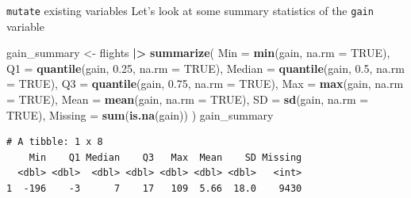 \documentclass[
  ignorenonframetext,
]{beamer}
\newenvironment{Shaded}{\begin{snugshade}}{\end{snugshade}}
\newcommand{\AttributeTok}[1]{\textcolor[rgb]{0.13,0.29,0.53}{#1}}
\newcommand{\ConstantTok}[1]{\textcolor[rgb]{0.56,0.35,0.01}{#1}}
\newcommand{\FloatTok}[1]{\textcolor[rgb]{0.00,0.00,0.81}{#1}}
\newcommand{\FunctionTok}[1]{\textcolor[rgb]{0.13,0.29,0.53}{\textbf{#1}}}
\newcommand{\NormalTok}[1]{#1}
\newcommand{\OtherTok}[1]{\textcolor[rgb]{0.56,0.35,0.01}{#1}}
\newcommand{\SpecialCharTok}[1]{\textcolor[rgb]{0.81,0.36,0.00}{\textbf{#1}}}
\begin{document}
\begin{frame}[fragile]{\texttt{mutate} existing variables}
\protect\hypertarget{mutate-existing-variables-6}{}
Let's look at some summary statistics of the \texttt{gain} variable

\small

\begin{Shaded}
\begin{Highlighting}[]
\NormalTok{gain\_summary }\OtherTok{\textless{}{-}}\NormalTok{ flights }\SpecialCharTok{|\textgreater{}} 
  \FunctionTok{summarize}\NormalTok{(}
    \AttributeTok{Min =} \FunctionTok{min}\NormalTok{(gain, }\AttributeTok{na.rm =} \ConstantTok{TRUE}\NormalTok{),}
    \AttributeTok{Q1 =} \FunctionTok{quantile}\NormalTok{(gain, }\FloatTok{0.25}\NormalTok{, }\AttributeTok{na.rm =} \ConstantTok{TRUE}\NormalTok{),}
    \AttributeTok{Median =} \FunctionTok{quantile}\NormalTok{(gain, }\FloatTok{0.5}\NormalTok{, }\AttributeTok{na.rm =} \ConstantTok{TRUE}\NormalTok{),}
    \AttributeTok{Q3 =} \FunctionTok{quantile}\NormalTok{(gain, }\FloatTok{0.75}\NormalTok{, }\AttributeTok{na.rm =} \ConstantTok{TRUE}\NormalTok{),}
    \AttributeTok{Max =} \FunctionTok{max}\NormalTok{(gain, }\AttributeTok{na.rm =} \ConstantTok{TRUE}\NormalTok{),}
    \AttributeTok{Mean =} \FunctionTok{mean}\NormalTok{(gain, }\AttributeTok{na.rm =} \ConstantTok{TRUE}\NormalTok{),}
    \AttributeTok{SD =} \FunctionTok{sd}\NormalTok{(gain, }\AttributeTok{na.rm =} \ConstantTok{TRUE}\NormalTok{),}
    \AttributeTok{Missing =} \FunctionTok{sum}\NormalTok{(}\FunctionTok{is.na}\NormalTok{(gain))}
\NormalTok{  )}
\NormalTok{gain\_summary}
\end{Highlighting}
\end{Shaded}

\begin{verbatim}
# A tibble: 1 x 8
    Min    Q1 Median    Q3   Max  Mean    SD Missing
  <dbl> <dbl>  <dbl> <dbl> <dbl> <dbl> <dbl>   <int>
1  -196    -3      7    17   109  5.66  18.0    9430
\end{verbatim}

\normalsize
\end{frame}
\end{document}
